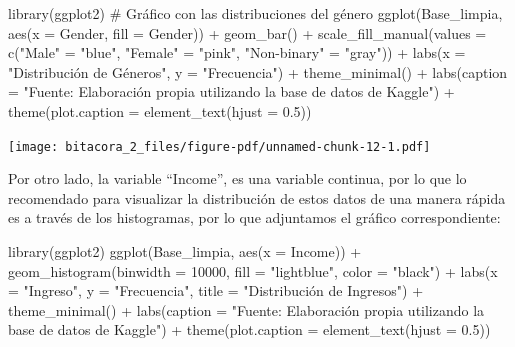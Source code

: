 \documentclass[
  letterpaper,
  DIV=11,
  numbers=noendperiod]{scrreprt}
\newenvironment{Shaded}{\begin{snugshade}}{\end{snugshade}}
\newcommand{\AttributeTok}[1]{\textcolor[rgb]{0.40,0.45,0.13}{#1}}
\newcommand{\CommentTok}[1]{\textcolor[rgb]{0.37,0.37,0.37}{#1}}
\newcommand{\DecValTok}[1]{\textcolor[rgb]{0.68,0.00,0.00}{#1}}
\newcommand{\FloatTok}[1]{\textcolor[rgb]{0.68,0.00,0.00}{#1}}
\newcommand{\FunctionTok}[1]{\textcolor[rgb]{0.28,0.35,0.67}{#1}}
\newcommand{\NormalTok}[1]{\textcolor[rgb]{0.00,0.23,0.31}{#1}}
\newcommand{\OtherTok}[1]{\textcolor[rgb]{0.00,0.23,0.31}{#1}}
\newcommand{\SpecialCharTok}[1]{\textcolor[rgb]{0.37,0.37,0.37}{#1}}
\newcommand{\StringTok}[1]{\textcolor[rgb]{0.13,0.47,0.30}{#1}}
\begin{document}
\begin{Shaded}
\begin{Highlighting}[]
\FunctionTok{library}\NormalTok{(ggplot2)}
\CommentTok{\# Gráfico con las distribuciones del género}
\FunctionTok{ggplot}\NormalTok{(Base\_limpia, }\FunctionTok{aes}\NormalTok{(}\AttributeTok{x =}\NormalTok{ Gender, }\AttributeTok{fill =}\NormalTok{ Gender)) }\SpecialCharTok{+}
  \FunctionTok{geom\_bar}\NormalTok{() }\SpecialCharTok{+}
  \FunctionTok{scale\_fill\_manual}\NormalTok{(}\AttributeTok{values =} \FunctionTok{c}\NormalTok{(}\StringTok{"Male"} \OtherTok{=} \StringTok{"blue"}\NormalTok{, }\StringTok{"Female"} \OtherTok{=} \StringTok{"pink"}\NormalTok{, }\StringTok{"Non{-}binary"} \OtherTok{=} \StringTok{"gray"}\NormalTok{)) }\SpecialCharTok{+}
  \FunctionTok{labs}\NormalTok{(}\AttributeTok{x =} \StringTok{"Distribución de Géneros"}\NormalTok{, }\AttributeTok{y =} \StringTok{"Frecuencia"}\NormalTok{) }\SpecialCharTok{+} \FunctionTok{theme\_minimal}\NormalTok{() }\SpecialCharTok{+}
  \FunctionTok{labs}\NormalTok{(}\AttributeTok{caption =} \StringTok{"Fuente: Elaboración propia utilizando la base de datos de Kaggle"}\NormalTok{) }\SpecialCharTok{+}
\FunctionTok{theme}\NormalTok{(}\AttributeTok{plot.caption =} \FunctionTok{element\_text}\NormalTok{(}\AttributeTok{hjust =} \FloatTok{0.5}\NormalTok{)) }
\end{Highlighting}
\end{Shaded}

\texttt{[image: bitacora\_2\_files/figure-pdf/unnamed-chunk-12-1.pdf]}

Por otro lado, la variable ``Income'', es una variable continua, por lo
que lo recomendado para visualizar la distribución de estos datos de una
manera rápida es a través de los histogramas, por lo que adjuntamos el
gráfico correspondiente:

\begin{Shaded}
\begin{Highlighting}[]
\FunctionTok{library}\NormalTok{(ggplot2)}
\FunctionTok{ggplot}\NormalTok{(Base\_limpia, }\FunctionTok{aes}\NormalTok{(}\AttributeTok{x =}\NormalTok{ Income)) }\SpecialCharTok{+} 
  \FunctionTok{geom\_histogram}\NormalTok{(}\AttributeTok{binwidth =} \DecValTok{10000}\NormalTok{, }\AttributeTok{fill =} \StringTok{"lightblue"}\NormalTok{, }\AttributeTok{color =} \StringTok{"black"}\NormalTok{) }\SpecialCharTok{+} 
  \FunctionTok{labs}\NormalTok{(}\AttributeTok{x =} \StringTok{"Ingreso"}\NormalTok{, }\AttributeTok{y =} \StringTok{"Frecuencia"}\NormalTok{, }\AttributeTok{title =} \StringTok{"Distribución de Ingresos"}\NormalTok{) }\SpecialCharTok{+}
 \FunctionTok{theme\_minimal}\NormalTok{() }\SpecialCharTok{+}
  \FunctionTok{labs}\NormalTok{(}\AttributeTok{caption =} \StringTok{"Fuente: Elaboración propia utilizando la base de datos de Kaggle"}\NormalTok{) }\SpecialCharTok{+}
\FunctionTok{theme}\NormalTok{(}\AttributeTok{plot.caption =} \FunctionTok{element\_text}\NormalTok{(}\AttributeTok{hjust =} \FloatTok{0.5}\NormalTok{)) }
\end{Highlighting}
\end{Shaded}
\end{document}
